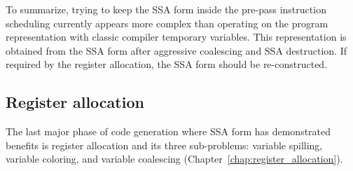 To summarize, trying to keep the SSA form inside the pre-pass instruction scheduling
currently appears more complex than operating on the program representation with
classic compiler temporary variables. This representation is obtained from the
SSA form after aggressive coalescing and SSA destruction. If required by the
register allocation, the SSA form should be re-constructed.

\subsection{Register allocation}

The last major phase of code generation where SSA form has demonstrated benefits
is register allocation and its three sub-problems: variable spilling, variable
coloring, and variable coalescing (Chapter~\ref{chap:register_allocation}).

